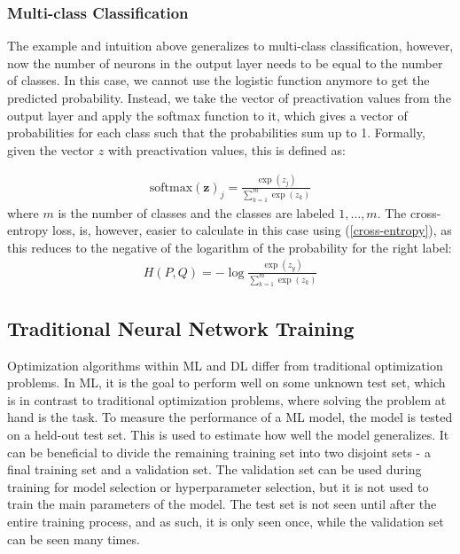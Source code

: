 \subsubsection{Multi-class Classification}
The example and intuition above generalizes to multi-class classification, however, now the number of neurons in the output layer needs to be equal to the number of classes. In this case, we cannot use the logistic function anymore to get the predicted probability. Instead, we take the vector of preactivation values from the output layer and apply the softmax function to it, which gives a vector of probabilities for each class such that the probabilities sum up to 1. Formally, given the vector $z$ with preactivation values, this is defined as: 

\begin{align}
    \label{softmax} \text{softmax} (\mathbf{z})_j = \frac{\exp(z_j)}{\sum_{k=1}^m \exp(z_k)}
\end{align}
where $m$ is the number of classes and the classes are labeled $1, \ldots, m$. The cross-entropy loss, is, however, easier to calculate in this case using (\ref{cross-entropy}), as this reduces to the negative of the logarithm of the probability for the right label:
\begin{align*}
    H(P,Q) = - \log \frac{\exp(z_y)} {\sum_{k=1}^m \exp(z_k)}
\end{align*}



\subsection{Traditional Neural Network Training}
Optimization algorithms within ML and DL differ from traditional optimization problems. In ML, it is the goal to perform well on some unknown test set, which is in contrast to traditional optimization problems, where solving the problem at hand is the task. To measure the performance of a ML model, the model is tested on a held-out test set. This is used to estimate how well the model generalizes. It can be beneficial to divide the remaining training set into two disjoint sets - a final training set and a validation set. The validation set can be used during training for model selection or hyperparameter selection, but it is not used to train the main parameters of the model. The test set is not seen until after the entire training process, and as such, it is only seen once, while the validation set can be seen many times. \\ 

